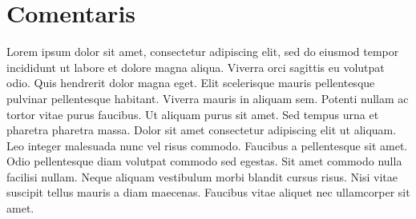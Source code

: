 \section{Comentaris}




Lorem ipsum dolor sit amet, consectetur adipiscing elit, sed do eiusmod tempor incididunt ut labore et dolore magna aliqua. Viverra orci sagittis eu volutpat odio. Quis hendrerit dolor magna eget. Elit scelerisque mauris pellentesque pulvinar pellentesque habitant. Viverra mauris in aliquam sem. Potenti nullam ac tortor vitae purus faucibus. Ut aliquam purus sit amet. Sed tempus urna et pharetra pharetra massa. Dolor sit amet consectetur adipiscing elit ut aliquam. Leo integer malesuada nunc vel risus commodo. Faucibus a pellentesque sit amet. Odio pellentesque diam volutpat commodo sed egestas. Sit amet commodo nulla facilisi nullam. Neque aliquam vestibulum morbi blandit cursus risus. Nisi vitae suscipit tellus mauris a diam maecenas. Faucibus vitae aliquet nec ullamcorper sit amet.
